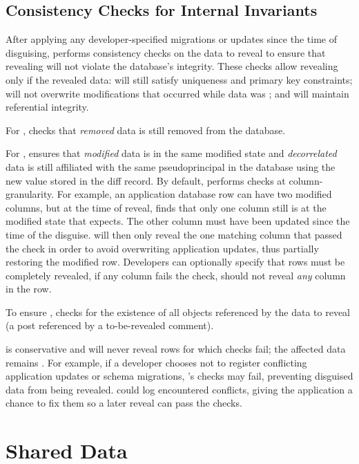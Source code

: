 \subsection{Consistency Checks for Internal Invariants} 
After applying any developer-specified migrations or updates since the time of
disguising, \sys performs consistency checks on the data to reveal
to ensure that revealing will not violate the database's integrity.
%
These checks allow revealing only if the revealed data: \one{} will still
satisfy uniqueness and primary key constraints; \two{} will not overwrite
modifications that occurred while data was \xxed; and \three{} will maintain
referential integrity.

For \one{}, \sys checks that \emph{removed} \xxed data is still removed from the
database.
%

%
For \two{}, \sys ensures that \emph{modified} \xxed data is in the same modified
state and \emph{decorrelated} \xxed data is still affiliated with the same
pseudoprincipal in the database using the new value stored in the diff record.
%
By default, \sys performs checks at column-granularity. For example, an application
database row can have two modified columns, but at the time of reveal, \sys
finds that only one column still is at the modified state that \sys expects. The
other column must have been updated since the time of the disguise.  \sys will
then only reveal the one matching column that passed the check in order to avoid
overwriting application updates, thus partially restoring the modified row.
Developers can optionally specify that rows must be completely revealed, \ie if
any column fails the check, \sys should not reveal \emph{any} column in the row.
%

%
To ensure \three{}, \sys checks for the existence of all objects referenced by
the data to reveal (\eg a post referenced by a to-be-revealed comment).

\sys is conservative and will never reveal rows for which checks fail; the
affected data remains \xxed.  For example, if a developer chooses not to
register conflicting application updates or schema migrations, \sys's checks may
fail, preventing disguised data from being revealed.
%
\sys could log encountered conflicts, giving the application a chance to fix
them so a later reveal can pass the checks.


\section{Shared Data}
\label{s:shared}


